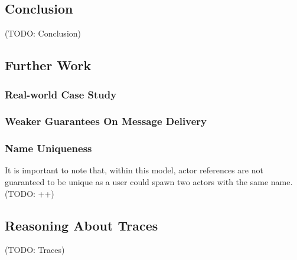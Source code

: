 \documentclass[a4paper,twoside]{article}
\newcommand{\TODO}[1]{\textcolor{YellowOrange}{(TODO: #1)}} %
\begin{document}
\subsection{Conclusion}

\TODO{Conclusion}

\subsection{Further Work}

\subsubsection*{Real-world Case Study}

\subsubsection*{Weaker Guarantees On Message Delivery}

\subsubsection*{Name Uniqueness}

It is important to note that, within this model, actor references are not guaranteed to be unique as a user could spawn two actors with the same name. \TODO{++}

\subsection{Reasoning About Traces}

\TODO{Traces}
\end{document}
